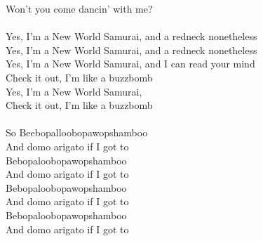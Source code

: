 \documentclass[10pt]{article}
\begin{document}
\begin{textblock*}{60mm}
Won't you come dancin' with me? \\
\\
Yes, I'm a New World Samurai, and a redneck nonetheless \\
Yes, I'm a New World Samurai, and a redneck nonetheless \\
Yes, I'm a New World Samurai, and I can read your mind \\
Check it out, I'm like a buzzbomb \\
Yes, I'm a New World Samurai, \\
Check it out, I'm like a buzzbomb\\ 
\\
So Beebopalloobopawopshamboo \\
And domo arigato if I got to \\
Bebopaloobopawopshamboo \\
And domo arigato if I got to \\
Bebopaloobopawopshamboo \\
And domo arigato if I got to \\
Bebopaloobopawopshamboo \\
And domo arigato if I got to \\
\end{textblock*}
\end{document}
